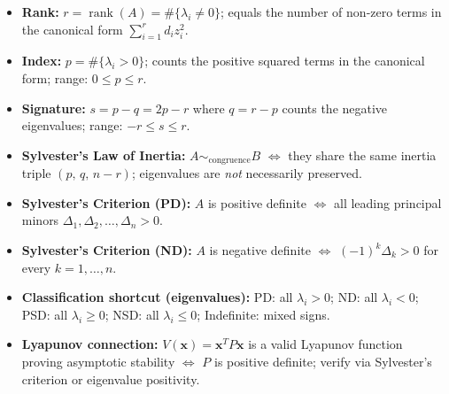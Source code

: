\documentclass[12pt,a4paper]{article}
\begin{document}
\begin{learnbox}
\begin{itemize}[noitemsep]
  \item \textbf{Rank:} \(r = \operatorname{rank}(A) = \#\{\lambda_i \neq 0\}\);
        equals the number of non-zero terms in the canonical form
        \(\displaystyle\sum_{i=1}^{r} d_i z_i^2\).

  \item \textbf{Index:} \(p = \#\{\lambda_i > 0\}\); counts the positive squared terms
        in the canonical form; range: \(0 \leq p \leq r\).

  \item \textbf{Signature:} \(s = p - q = 2p - r\) where \(q = r - p\) counts the
        negative eigenvalues; range: \(-r \leq s \leq r\).

  \item \textbf{Sylvester's Law of Inertia:} \(A \sim_{\text{congruence}} B\)
        \(\iff\) they share the same inertia triple \((p,\, q,\, n-r)\);
        eigenvalues are \emph{not} necessarily preserved.

  \item \textbf{Sylvester's Criterion (PD):}
        \(A\) is positive definite \(\iff\) all leading principal minors
        \(\Delta_1, \Delta_2, \ldots, \Delta_n > 0\).

  \item \textbf{Sylvester's Criterion (ND):}
        \(A\) is negative definite \(\iff\) \((-1)^k \Delta_k > 0\) for every
        \(k = 1, \ldots, n\).

  \item \textbf{Classification shortcut (eigenvalues):}
        PD: all \(\lambda_i > 0\); ND: all \(\lambda_i < 0\); PSD: all \(\lambda_i \geq 0\);
        NSD: all \(\lambda_i \leq 0\); Indefinite: mixed signs.

  \item \textbf{Lyapunov connection:} \(V(\mathbf{x}) = \mathbf{x}^T P \mathbf{x}\) is a
        valid Lyapunov function proving asymptotic stability \(\iff\) \(P\) is positive
        definite; verify via Sylvester's criterion or eigenvalue positivity.
\end{itemize}
\end{learnbox}
\end{document}
